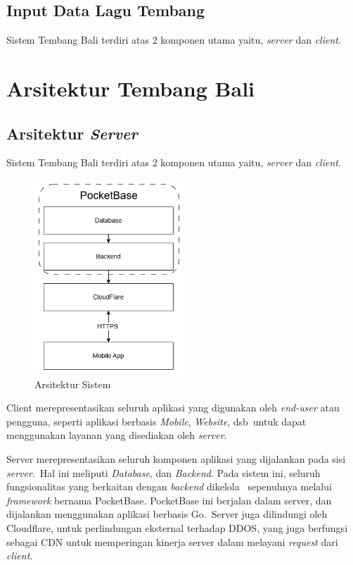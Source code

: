 \documentclass[a4paper, 12pt]{article}
\begin{document}
\subsection{Input Data Lagu Tembang}
Sistem Tembang Bali terdiri atas 2 komponen utama yaitu, \textit{server} dan \textit{client}.

\section{Arsitektur Tembang Bali}

\subsection{Arsitektur \textit{Server}}
Sistem Tembang Bali terdiri atas 2 komponen utama yaitu, \textit{server} dan \textit{client}.

\begin{figure}[H]
    \centering
    \includegraphics[width=0.5\textwidth]{assets/hla.png}
    \caption{Arsitektur Sistem}
\end{figure}

Client merepresentasikan seluruh aplikasi yang digunakan oleh \textit{end-user} atau pengguna, seperti aplikasi berbasis \textit{Mobile}, \textit{Website}, dsb\
untuk dapat menggunakan layanan yang disediakan oleh \textit{server}.

Server merepresentasikan seluruh komponen aplikasi yang dijalankan pada sisi \textit{server}.\
Hal ini meliputi \textit{Database}, dan \textit{Backend}. Pada sistem ini, seluruh fungsionalitas yang berkaitan dengan \textit{backend} dikelola \
sepenuhnya melalui \textit{framework} bernama PocketBase. PocketBase ini berjalan dalam server, dan dijalankan menggunakan aplikasi berbasis Go.\
Server juga dilindungi oleh Cloudflare, untuk perlindungan eksternal terhadap DDOS, yang juga berfungsi sebagai CDN untuk memperingan kinerja server dalam melayani \textit{request} dari \textit{client}.
\end{document}
